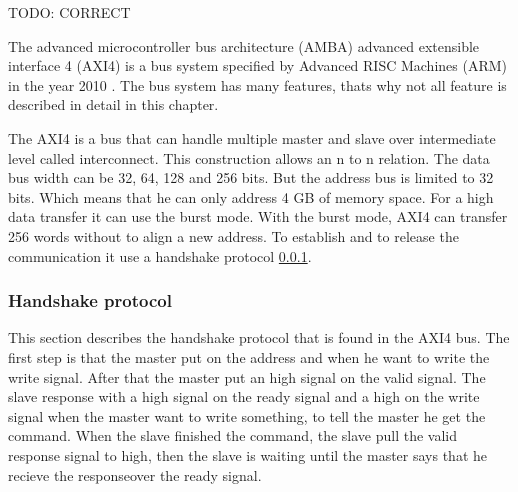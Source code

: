 TODO: CORRECT

The  advanced microcontroller bus architecture (AMBA) advanced extensible interface 4 (AXI4) is a bus system specified by Advanced RISC Machines (ARM) in the year 2010 \cite{6129797}. The bus system has many features, thats why not all feature is described in detail in this chapter.

The AXI4 is a bus that can handle multiple master and slave over intermediate level called interconnect. This construction allows an n to n relation. The data bus width can be 32, 64, 128 and 256 bits. But the address bus is limited to 32 bits. Which means that he can only address 4 GB of memory space. For a high data transfer it can use the burst mode. With the burst mode, AXI4 can transfer 256 words without to align a new address. To establish and to release the communication it use a handshake protocol \cref{section:handshake}\cite{6129797}. 

\subsubsection{Handshake protocol}
\label{section:handshake}

This section describes the handshake protocol that is found in the AXI4 bus. The first step is that the master put on the address and when he want to write the write signal. After that the master put an high signal on the valid signal. The slave response with a high signal on the ready signal and a high on the write signal when the master want to write something, to tell the master he get the command. When the slave finished the command, the slave pull the valid response signal to high, then the slave is waiting until the master says that he recieve the responseover the ready signal.


